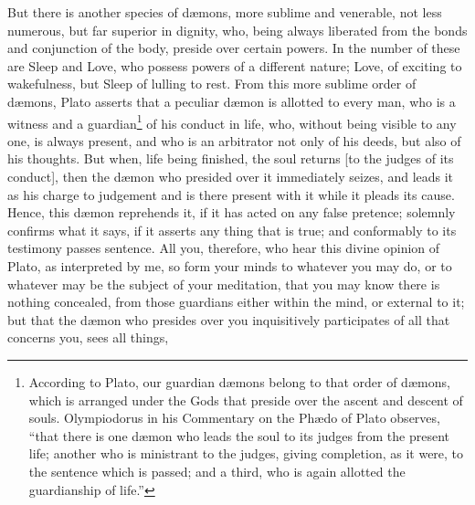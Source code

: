 \documentclass[12pt]{article}
\begin{document}
But there is another species of d{\ae}mons, more sublime and venerable, not
less numerous, but far superior in dignity, who, being always liberated from
the bonds and conjunction of the body, preside over certain powers. In the
number of these are Sleep and Love, who possess powers of a different nature;
Love, of exciting to wakefulness, but Sleep of lulling to rest. From this more
sublime order of d{\ae}mons, Plato asserts that a peculiar d{\ae}mon is
allotted to every man, who is a witness and a guardian\footnote{According to
Plato, our guardian d{\ae}mons belong to that order of d{\ae}mons, which is
arranged under the Gods that preside over the ascent and descent of souls.
Olympiodorus in his Commentary on the Ph{\ae}do of Plato observes,
``that there is one d{\ae}mon who leads the soul to its judges from the present
life; another who is ministrant to the judges, giving completion, as it were,
to the sentence which is passed; and a third, who is again allotted the
guardianship of life.''} of his conduct in life, who, without being visible to
any one, is always present, and who is an arbitrator not only of his deeds, but
also of his thoughts.  But when, life being finished, the soul returns [to the
judges of its conduct], then the d{\ae}mon who presided over it immediately
seizes, and leads it as his charge to judgement and is there present with it
while it pleads its cause. Hence, this d{\ae}mon reprehends it, if it has acted
on any false pretence; solemnly confirms what it says, if it asserts any thing
that is true; and conformably to its testimony passes sentence. All you,
therefore, who hear this divine opinion of Plato, as interpreted by me, so form
your minds to whatever you may do, or to whatever may be the subject of your
meditation, that you may know there is nothing concealed, from those guardians
either within the mind, or external to it; but that the d{\ae}mon who presides
over you inquisitively participates of all that concerns you, sees all things,
\end{document}
